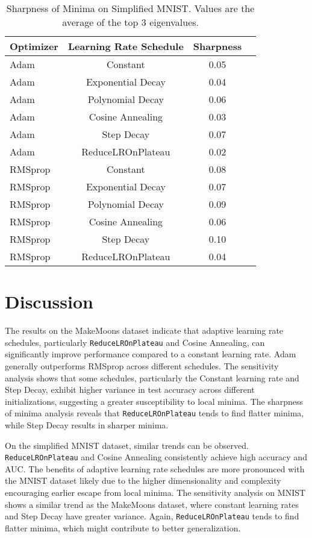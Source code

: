 \documentclass[conference]{IEEEtran}
\begin{document}
\begin{table}[htbp]
\centering
\caption{Sharpness of Minima on Simplified MNIST. Values are the average of the top 3 eigenvalues.}
\label{tab:mnist_sharpness}
\begin{tabular}{@{}lccc@{}}
\toprule
Optimizer & Learning Rate Schedule & Sharpness \\ \midrule
Adam      & Constant              & 0.05          \\
Adam      & Exponential Decay     & 0.04          \\
Adam      & Polynomial Decay      & 0.06          \\
Adam      & Cosine Annealing      & 0.03       \\
Adam      & Step Decay            & 0.07     \\
Adam      & ReduceLROnPlateau     & 0.02       \\
RMSprop   & Constant              & 0.08         \\
RMSprop   & Exponential Decay     & 0.07          \\
RMSprop   & Polynomial Decay      & 0.09          \\
RMSprop   & Cosine Annealing      & 0.06        \\
RMSprop   & Step Decay            & 0.10          \\
RMSprop   & ReduceLROnPlateau     & 0.04        \\ \bottomrule
\end{tabular}
\end{table}

\section{Discussion}

The results on the MakeMoons dataset indicate that adaptive learning rate schedules, particularly \texttt{ReduceLROnPlateau} and Cosine Annealing, can significantly improve performance compared to a constant learning rate. Adam generally outperforms RMSprop across different schedules.  The sensitivity analysis shows that some schedules, particularly the Constant learning rate and Step Decay, exhibit higher variance in test accuracy across different initializations, suggesting a greater susceptibility to local minima.  The sharpness of minima analysis reveals that \texttt{ReduceLROnPlateau} tends to find flatter minima, while Step Decay results in sharper minima.

On the simplified MNIST dataset, similar trends can be observed.  \texttt{ReduceLROnPlateau} and Cosine Annealing consistently achieve high accuracy and AUC.  The benefits of adaptive learning rate schedules are more pronounced with the MNIST dataset likely due to the higher dimensionality and complexity encouraging earlier escape from local minima. The sensitivity analysis on MNIST shows a similar trend as the MakeMoons dataset, where constant learning rates and Step Decay have greater variance.  Again, \texttt{ReduceLROnPlateau} tends to find flatter minima, which might contribute to better generalization.
\end{document}
